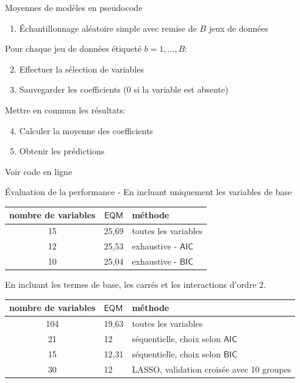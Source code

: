 \documentclass[
  ignorenonframetext,
]{beamer}
\providecommand{\tightlist}{%
  \setlength{\itemsep}{0pt}\setlength{\parskip}{0pt}}\usepackage{longtable,booktabs,array}
\begin{document}
\begin{frame}{Moyennes de modèles en pseudocode}
\protect\hypertarget{moyennes-de-moduxe8les-en-pseudocode}{}
\begin{enumerate}
\tightlist
\item
  Échantillonnage aléatoire simple avec remise de \(B\) jeux de données
\end{enumerate}

Pour chaque jeu de données étiqueté \(b=1, \ldots, B\):

\begin{enumerate}
\setcounter{enumi}{1}
\tightlist
\item
  Effectuer la sélection de variables
\item
  Sauvegarder les coefficients (0 si la variable est absente)
\end{enumerate}

Mettre en commun les résultats:

\begin{enumerate}
\setcounter{enumi}{3}
\tightlist
\item
  Calculer la moyenne des coefficients
\item
  Obtenir les prédictions
\end{enumerate}

\footnotesize

Voir code en ligne

\normalsize
\end{frame}

\begin{frame}{Évaluation de la performance -}
\protect\hypertarget{uxe9valuation-de-la-performance--}{}
En incluant uniquement les variables de base

\begin{longtable}[]{@{}ccl@{}}
\toprule()
nombre de variables & \(\mathsf{EQM}\) & méthode \\
\midrule()
\endhead
15 & 25,69 & toutes les variables \\
12 & 25,53 & exhaustive - \(\mathsf{AIC}\) \\
10 & 25,04 & exhaustive - \(\mathsf{BIC}\) \\
\bottomrule()
\end{longtable}

En incluant les termes de base, les carrés et les interactions d'ordre
2.

\begin{longtable}[]{@{}cll@{}}
\toprule()
nombre de variables & \(\mathsf{EQM}\) & méthode \\
\midrule()
\endhead
104 & 19,63 & toutes les variables \\
21 & 12 & séquentielle, choix selon \(\mathsf{AIC}\) \\
15 & 12,31 & séquentielle, choix selon \(\mathsf{BIC}\) \\
30 & 12 & LASSO, validation croisée avec 10 groupes \\
\bottomrule()
\end{longtable}
\end{frame}
\end{document}
